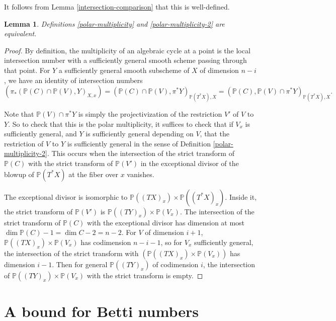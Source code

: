 \documentclass[12pt]{amsart}
\newtheorem{lemma}[theorem]{Lemma}
\theoremstyle{definition}
\theoremstyle{remark}
\begin{document}
It follows from Lemma \ref{intersection-comparison} that this is well-defined.




\begin{lemma}\label{multiplicity-polar} Definitions \ref{polar-multiplicity} and \ref{polar-multiplicity-2} are equivalent.
 \end{lemma}

\begin{proof} By definition, the multiplicity of an algebraic cycle at a point is the local intersection number with a sufficiently general smooth scheme passing through that point. For $Y$ a sufficiently general smooth subscheme of $X$ of dimension $n-i$, we have an identity of intersection numbers \[ (\pi_* ( \mathbb P(C) \cap \mathbb P(V) , Y)_{X,x}) = (\mathbb P(C) \cap \mathbb P(V), \pi^* Y)_{\mathbb P(T^*X), X} =  (\mathbb P(C), \mathbb P(V) \cap \pi^* Y)_{\mathbb P(T^*X), X} .\]

Note that $\mathbb P(V) \cap \pi^* Y$ is simply the projectivization of the restriction $V'$ of $V$ to $Y$. So to check that this is the polar multiplicity, it suffices to check that if $V_x$ is sufficiently general, and $Y$ is sufficiently general depending on $V$, that the restriction of $V$ to $Y$ is sufficiently general in the sense of Definition \ref{polar-multiplicity-2}. This occurs when the intersection of the strict transform of $\mathbb P(C)$ with the strict transform of $\mathbb P(V')$ in the exceptional divisor of the blowup of $\mathbb P (T^* X)$ at the fiber over $x$ vanishes.

The exceptional divisor is isomorphic to $\mathbb P ( (TX)_x ) \times \mathbb P( (T^*X)_x) $. Inside it, the strict transform of $\mathbb P(V')$ is $\mathbb P ( (TY)_x) \times \mathbb P (  V_x)$. The intersection of the strict transform of $\mathbb P(C)$ with the exceptional divisor has dimension at most $\dim \mathbb P(C) -1 =\dim C-2= n-2$. For $V$ of dimension $i+1$, $\mathbb P( (TX)_x) \times \mathbb P( V_x)$ has codimension $n-i-1$, so for $V_x$ sufficiently general,  the intersection of the strict transform with $( \mathbb P( (TX)_x) \times \mathbb P( V_x))$ has dimension $i-1$. Then for general $\mathbb P( (TY)_x)$ of codimension $i$, the intersection of $\mathbb P ( (TY)_x) \times \mathbb P (  V_x)$ with the strict transform is empty.  
\end{proof} 


\section{A bound for Betti numbers}
\end{document}
